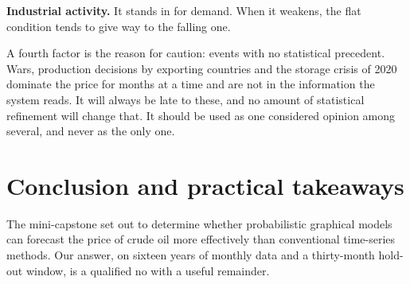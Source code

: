 \documentclass[11pt,a4paper]{article}
\begin{document}
\textbf{Industrial activity.} It stands in for demand. When it weakens, the flat condition tends to
give way to the falling one.

A fourth factor is the reason for caution: events with no statistical precedent. Wars, production
decisions by exporting countries and the storage crisis of 2020 dominate the price for months at a
time and are not in the information the system reads. It will always be late to these, and no
amount of statistical refinement will change that. It should be used as one considered opinion
among several, and never as the only one.

\section{Conclusion and practical takeaways}

The mini-capstone set out to determine whether probabilistic graphical models can forecast the
price of crude oil more effectively than conventional time-series methods. Our answer, on sixteen
years of monthly data and a thirty-month hold-out window, is a qualified no with a useful
remainder.
\end{document}
